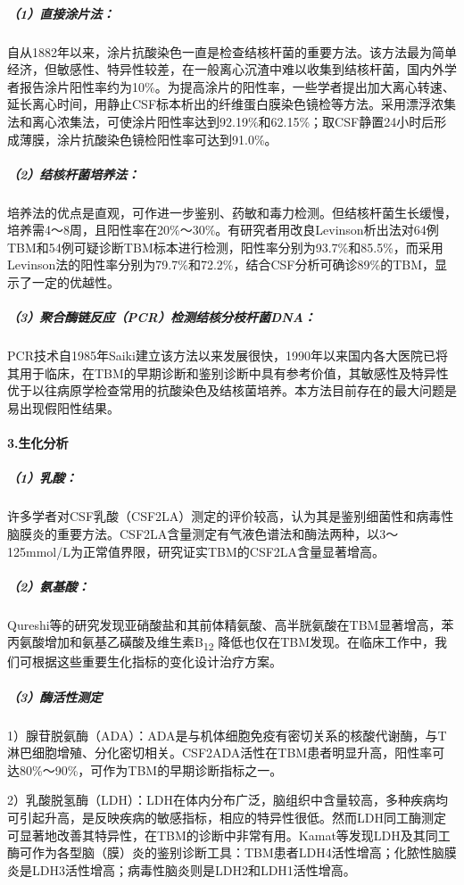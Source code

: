 \subparagraph{（1）直接涂片法：}

自从1882年以来，涂片抗酸染色一直是检查结核杆菌的重要方法。该方法最为简单经济，但敏感性、特异性较差，在一般离心沉渣中难以收集到结核杆菌，国内外学者报告涂片阳性率约为10\%。为提高涂片的阳性率，一些学者提出加大离心转速、延长离心时间，用静止CSF标本析出的纤维蛋白膜染色镜检等方法。采用漂浮浓集法和离心浓集法，可使涂片阳性率达到92.19\%和62.15\%；取CSF静置24小时后形成薄膜，涂片抗酸染色镜检阳性率可达到91.0\%。

\subparagraph{（2）结核杆菌培养法：}

培养法的优点是直观，可作进一步鉴别、药敏和毒力检测。但结核杆菌生长缓慢，培养需4～8周，且阳性率在20\%～30\%。有研究者用改良Levinson析出法对64例TBM和54例可疑诊断TBM标本进行检测，阳性率分别为93.7\%和85.5\%，而采用Levinson法的阳性率分别为79.7\%和72.2\%，结合CSF分析可确诊89\%的TBM，显示了一定的优越性。

\subparagraph{（3）聚合酶链反应（PCR）检测结核分枝杆菌DNA：}

PCR技术自1985年Saiki建立该方法以来发展很快，1990年以来国内各大医院已将其用于临床，在TBM的早期诊断和鉴别诊断中具有参考价值，其敏感性及特异性优于以往病原学检查常用的抗酸染色及结核菌培养。本方法目前存在的最大问题是易出现假阳性结果。

\paragraph{3.生化分析}

\subparagraph{（1）乳酸：}

许多学者对CSF乳酸（CSF2LA）测定的评价较高，认为其是鉴别细菌性和病毒性脑膜炎的重要方法。CSF2LA含量测定有气液色谱法和酶法两种，以3～125mmol/L为正常值界限，研究证实TBM的CSF2LA含量显著增高。

\subparagraph{（2）氨基酸：}

Qureshi等的研究发现亚硝酸盐和其前体精氨酸、高半胱氨酸在TBM显著增高，苯丙氨酸增加和氨基乙磺酸及维生素B\textsubscript{12}
降低也仅在TBM发现。在临床工作中，我们可根据这些重要生化指标的变化设计治疗方案。

\subparagraph{（3）酶活性测定}

1）腺苷脱氨酶（ADA）：ADA是与机体细胞免疫有密切关系的核酸代谢酶，与T淋巴细胞增殖、分化密切相关。CSF2ADA活性在TBM患者明显升高，阳性率可达80\%～90\%，可作为TBM的早期诊断指标之一。

2）乳酸脱氢酶（LDH）：LDH在体内分布广泛，脑组织中含量较高，多种疾病均可引起升高，是反映疾病的敏感指标，相应的特异性很低。然而LDH同工酶测定可显著地改善其特异性，在TBM的诊断中非常有用。Kamat等发现LDH及其同工酶可作为各型脑（膜）炎的鉴别诊断工具：TBM患者LDH4活性增高；化脓性脑膜炎是LDH3活性增高；病毒性脑炎则是LDH2和LDH1活性增高。

